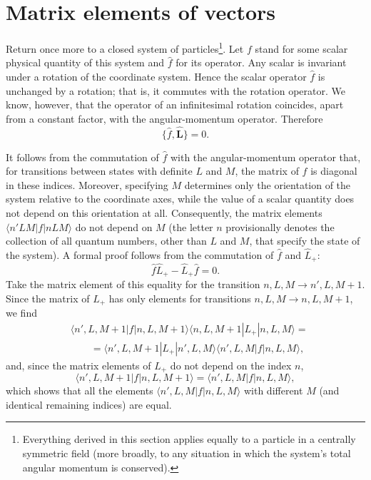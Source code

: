 \section{Matrix elements of vectors}

Return once more to a closed system of particles\footnote{Everything derived in
this section applies equally to a particle in a centrally symmetric field (more
broadly, to any situation in which the system's total angular momentum is
conserved).}. Let $f$ stand for some scalar physical quantity of this system
and $\hat f$ for its operator. Any
scalar is invariant under a rotation of the coordinate system. Hence the
scalar operator $\hat f$ is unchanged by a rotation; that is, it commutes with
the rotation operator. We know, however, that the operator of an infinitesimal
rotation coincides, apart from a constant factor, with the angular-momentum
operator. Therefore
\begin{equation}
  \{\hat f,\hat{\mathbf L}\}=0.
  \tag{29.1}
\end{equation}

It follows from the commutation of $\hat f$ with the angular-momentum operator
that, for transitions between states with definite $L$ and $M$, the matrix of
$f$ is diagonal in these indices. Moreover, specifying $M$ determines only
the orientation of the system relative to the coordinate axes, while the
value of a scalar quantity does not depend on this orientation at all.
Consequently, the matrix elements $\langle n'LM|f|nLM\rangle$ do not depend
on $M$ (the letter $n$ provisionally denotes the collection of all quantum
numbers, other than $L$ and $M$, that specify the state of the system). A
formal proof follows from the commutation of $\hat f$ and $\hat L_+$:
\begin{equation}
  \hat f\hat L_+-\hat L_+\hat f=0.
  \tag{29.2}
\end{equation}
Take the matrix element of this equality for the transition
$n,L,M\to n',L,M+1$. Since the matrix of $L_+$ has only elements for
transitions $n,L,M\to n,L,M+1$, we find
\begin{align*}
 &\langle n',L,M+1|f|n,L,M+1\rangle
 \langle n,L,M+1|L_+|n,L,M\rangle={}\\
 &\qquad=\langle n',L,M+1|L_+|n',L,M\rangle
 \langle n',L,M|f|n,L,M\rangle,
\end{align*}
and, since the matrix elements of $L_+$ do not depend on the index $n$,
\begin{equation}
 \langle n',L,M+1|f|n,L,M+1\rangle
 =\langle n',L,M|f|n,L,M\rangle,
 \tag{29.3}
\end{equation}
which shows that all the elements $\langle n',L,M|f|n,L,M\rangle$ with
different $M$ (and identical remaining indices) are equal.

